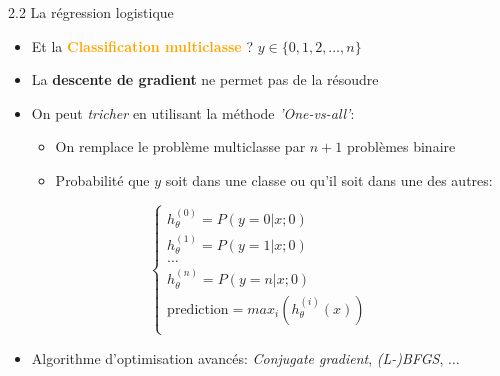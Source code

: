 \begin{frame}{2.2 La régression logistique}
  \begin{itemize}
  \item Et la \textcolor{orange}{\textbf{Classification multiclasse}} ? $y \in \{0,1,2,\dots,n\}$
  \item La \textbf{descente de gradient} ne permet pas de la résoudre
  \item On peut \textit{tricher} en utilisant la méthode \textit{'One-vs-all'}:
    \begin{itemize}
    \item On remplace le problème multiclasse par $n+1$ problèmes binaire
    \item Probabilité que $y$ soit dans une classe ou qu'il soit dans une des autres:
    \end{itemize}
  \end{itemize}
  \begin{equation*}
    \begin{cases}
      h_{\theta}^{(0)} = P(y=0 | x;0)\\
      h_{\theta}^{(1)} = P(y=1 | x;0)\\
      \dots \\
      h_{\theta}^{(n)} = P(y=n | x;0)\\
      \text{prediction} = max_{i}(h_{\theta}^{(i)}(x))\\
    \end{cases}
  \end{equation*}
  \begin{itemize}
  \item Algorithme d'optimisation avancés: \textit{Conjugate gradient}, \textit{(L-)BFGS}, $\dots$
  \end{itemize}
\end{frame}

